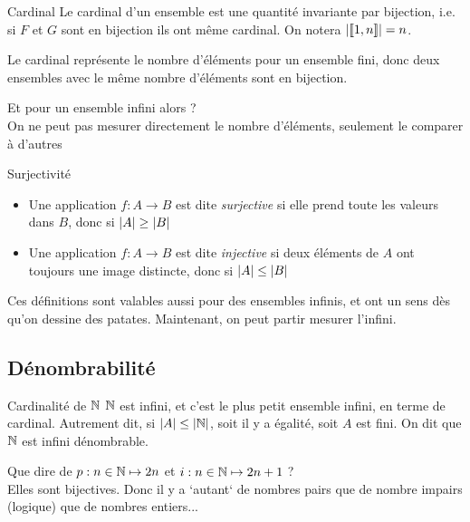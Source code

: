 \documentclass{cours}
\begin{document}
    \begin{définition}{Cardinal}{}
        Le cardinal d'un ensemble est une quantité invariante par bijection, i.e. si $F$ et $G$ sont en bijection ils ont même cardinal. On notera $\left|\llbracket 1, n \rrbracket\right| = n$.
    \end{définition}

    \begin{remarque}{}{}
        Le cardinal représente le nombre d'éléments pour un ensemble fini, donc deux ensembles avec le même nombre d'éléments sont en bijection.
    \end{remarque}
    
    Et pour un ensemble infini alors ? \\
    On ne peut pas mesurer directement le nombre d'éléments, seulement le comparer à d'autres        
    
    \begin{définition}{Surjectivité}{}
        \begin{itemize}
            \item Une application $f : A \rightarrow B$ est dite \emph{surjective} si elle prend toute les valeurs dans $B$, donc si $\left|A\right| \geq \left|B\right|$
            \item Une application $f : A \rightarrow B$ est dite \emph{injective} si deux éléments de $A$ ont toujours une image distincte, donc si $\left|A\right| \leq \left|B\right|$
        \end{itemize}       
    \end{définition}

    \begin{remarque}{}{}
        Ces définitions sont valables aussi pour des ensembles infinis, et ont un sens dès qu'on dessine des patates. Maintenant, on peut partir mesurer l'infini.
    \end{remarque}

    \subsection{Dénombrabilité}
    \begin{propositionfr}{Cardinalité de $\mathbb{N}$}{}
        $\mathbb{N}$ est infini, et c'est le plus petit ensemble infini, en terme de cardinal. Autrement dit, si $\left|A\right| \leq \left|\mathbb{N}\right|$, soit il y a égalité, soit $A$ est fini. On dit que $\mathbb{N}$ est infini dénombrable.
    \end{propositionfr}
    
    \begin{remarque}{}{}
        Que dire de $p : n \in \mathbb{N} \mapsto 2n$ et $i : n \in \mathbb{N} \mapsto 2n + 1$ ? \\
        Elles sont bijectives. Donc il y a `autant` de nombres pairs que de nombre impairs (logique) que de nombres entiers...
    \end{remarque}
\end{document}
